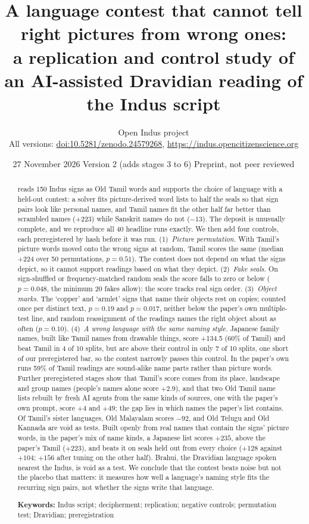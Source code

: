 \documentclass[11pt,a4paper]{article}
\title{\textbf{A language contest that cannot tell right pictures from wrong ones:\\a replication and control study of an AI-assisted Dravidian reading of the Indus script}}
\author{Open Indus project\\[2pt]\small All versions: \href{https://doi.org/10.5281/zenodo.24579268}{doi:10.5281/zenodo.24579268}, \url{https://indus.opencitizenscience.org}}
\date{27 November 2026 \quad Version 2 (adds stages 3 to 6) \quad Preprint, not peer reviewed}
\begin{document}
\maketitle

\begin{abstract}
\noindent \citet{raj2026} reads 150 Indus signs as Old Tamil words and supports the choice of language with a held-out contest: a solver fits picture-derived word lists to half the seals so that sign pairs look like personal names, and Tamil names fit the other half far better than scrambled names (+223) while Sanskrit names do not ($-13$). The deposit is unusually complete, and we reproduce all 40 headline runs exactly. We then add four controls, each preregistered by hash before it was run. (1)~\emph{Picture permutation.} With Tamil's picture words moved onto the wrong signs at random, Tamil scores the same (median +224 over 50 permutations, $p=0.51$). The contest does not depend on what the signs depict, so it cannot support readings based on what they depict. (2)~\emph{Fake seals.} On sign-shuffled or frequency-matched random seals the score falls to zero or below ($p=0.048$, the minimum 20 fakes allow): the score tracks real sign order. (3)~\emph{Object marks.} The `copper' and `armlet' signs that name their objects rest on copies; counted once per distinct text, $p=0.19$ and $p=0.017$, neither below the paper's own multiple-test line, and random reassignment of the readings names the right object about as often ($p=0.10$). (4)~\emph{A wrong language with the same naming style.} Japanese family names, built like Tamil names from drawable things, score +134.5 (60\% of Tamil) and beat Tamil in 4 of 10 splits, but are above their control in only 7 of 10 splits, one short of our preregistered bar, so the contest narrowly passes this control. In the paper's own runs 59\% of Tamil readings are sound-alike name parts rather than picture words. Further preregistered stages show that Tamil's score comes from its place, landscape and group names (people's names alone score $+2.9$), and that two Old Tamil name lists rebuilt by fresh AI agents from the same kinds of sources, one with the paper's own prompt, score $+4$ and $+49$; the gap lies in which names the paper's list contains. Of Tamil's sister languages, Old Malayalam scores $-92$, and Old Telugu and Old Kannada are void as tests. Built openly from real names that contain the signs' picture words, in the paper's mix of name kinds, a Japanese list scores $+235$, above the paper's Tamil ($+223$), and beats it on seals held out from every choice ($+128$ against $+104$; $+156$ after tuning on the other half). Brahui, the Dravidian language spoken nearest the Indus, is void as a test. We conclude that the contest beats noise but not the placebo that matters: it measures how well a language's naming style fits the recurring sign pairs, not whether the signs write that language.

\medskip
\noindent\textbf{Keywords:} Indus script; decipherment; replication; negative controls; permutation test; Dravidian; preregistration
\end{abstract}
\end{document}
